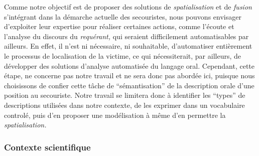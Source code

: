 Comme notre objectif est de proposer des solutions de
\emph{spatialisation} et de \emph{fusion} s'intégrant dans la démarche
actuelle des secouristes, nous pouvons envisager d'exploiter leur
expertise pour réaliser certaines actions, comme l'écoute et l'analyse
du discours du \emph{requérant,} qui seraient difficilement
automatisables par ailleurs. En effet, il n'est ni nécessaire, ni
souhaitable, d'automatiser entièrement le processus de localisation de
la victime, ce qui nécessiterait, par ailleurs, de développer des
solutions d'analyse automatisée du langage oral. Cependant, cette
étape, ne concerne pas notre travail et ne sera donc pas abordée ici,
puisque nous choisissons de confier cette tâche de
\enquote{sémantisation} de la description orale d'une position au
secouriste. Notre travail se limitera donc à identifier les
\enquote{types} de descriptions utilisées dans notre contexte, de les
exprimer dans un vocabulaire controlé, puis d'en proposer une
modélisation à même d'en permettre la \emph{spatialisation.}

\subsubsection{Contexte scientifique}

